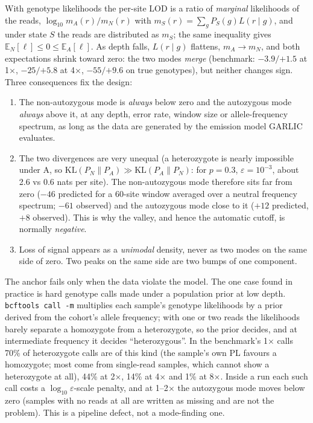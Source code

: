 \documentclass[11pt]{article}
\newcommand{\KL}{\mathrm{KL}}
\newcommand{\code}[1]{\texttt{#1}}
\begin{document}
With genotype likelihoods the per-site LOD is a ratio of \emph{marginal} likelihoods of the reads, $\log_{10} m_A(r)/m_N(r)$ with $m_S(r)=\sum_g P_S(g)L(r\mid g)$, and under state $S$ the reads are distributed as $m_S$; the same inequality gives $\mathbb{E}_N[\ell]\le 0\le \mathbb{E}_A[\ell]$. As depth falls, $L(r\mid g)$ flattens, $m_A\to m_N$, and both expectations shrink toward zero: the two modes \emph{merge} (benchmark: $-3.9/{+1.5}$ at 1$\times$, $-25/{+5.8}$ at 4$\times$, $-55/{+9.6}$ on true genotypes), but neither changes sign. Three consequences fix the design:
\begin{enumerate}[nosep]
\item The non-autozygous mode is \emph{always} below zero and the autozygous mode \emph{always} above it, at any depth, error rate, window size or allele-frequency spectrum, as long as the data are generated by the emission model GARLIC evaluates.
\item The two divergences are very unequal (a heterozygote is nearly impossible under A, so $\KL(P_N\|P_A)\gg\KL(P_A\|P_N)$: for $p=0.3$, $\varepsilon=10^{-3}$, about 2.6 vs 0.6 nats per site). The non-autozygous mode therefore sits far from zero ($-46$ predicted for a 60-site window averaged over a neutral frequency spectrum; $-61$ observed) and the autozygous mode close to it ($+12$ predicted, $+8$ observed). This is why the valley, and hence the automatic cutoff, is normally \emph{negative}.
\item Loss of signal appears as a \emph{unimodal} density, never as two modes on the same side of zero. Two peaks on the same side are two bumps of one component.
\end{enumerate}
The anchor fails only when the data violate the model. The one case found in practice is hard genotype calls made under a population prior at low depth. \code{bcftools call -m} multiplies each sample's genotype likelihoods by a prior derived from the cohort's allele frequency; with one or two reads the likelihoods barely separate a homozygote from a heterozygote, so the prior decides, and at intermediate frequency it decides ``heterozygous''. In the benchmark's 1$\times$ calls 70\% of heterozygote calls are of this kind (the sample's own PL favours a homozygote; most come from single-read samples, which cannot show a heterozygote at all), 44\% at 2$\times$, 14\% at 4$\times$ and 1\% at 8$\times$. Inside a run each such call costs a $\log_{10}\varepsilon$-scale penalty, and at 1--2$\times$ the autozygous mode moves below zero (samples with no reads at all are written as missing and are not the problem). This is a pipeline defect, not a mode-finding one.
\end{document}
